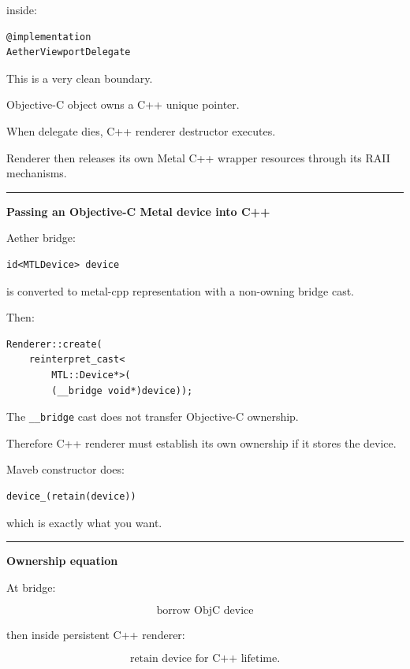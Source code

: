 inside:

\begin{verbatim}
@implementation
AetherViewportDelegate
\end{verbatim}

This is a very clean boundary.

Objective-C object owns a C++ unique pointer.

When delegate dies, C++ renderer destructor executes.

Renderer then releases its own Metal C++ wrapper resources through its RAII mechanisms.

\begin{center}\rule{0.5\linewidth}{0.5pt}\end{center}

\textbf{Passing an Objective-C Metal device into C++}

Aether bridge:

\begin{verbatim}
id<MTLDevice> device
\end{verbatim}

is converted to metal-cpp representation with a non-owning bridge cast.

Then:

\begin{verbatim}
Renderer::create(
    reinterpret_cast<
        MTL::Device*>(
        (__bridge void*)device));
\end{verbatim}

The \texttt{\_\_bridge} cast does not transfer Objective-C ownership.

Therefore C++ renderer must establish its own ownership if it stores the device.

Maveb constructor does:

\begin{verbatim}
device_(retain(device))
\end{verbatim}

which is exactly what you want.

\begin{center}\rule{0.5\linewidth}{0.5pt}\end{center}

\textbf{Ownership equation}

At bridge:

\[
\boxed{
\text{borrow ObjC device}
}
\]

then inside persistent C++ renderer:

\[
\boxed{
\text{retain device for C++ lifetime}.
}
\]

